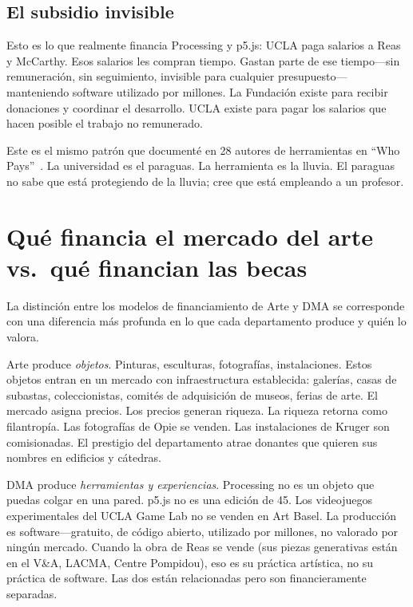 \documentclass[10pt,letterpaper,twocolumn]{article}
\newcommand{\dma}{\textsc{DMA}}
\begin{document}
\subsection{El subsidio invisible}

Esto es lo que realmente financia Processing y p5.js: UCLA paga salarios a Reas y McCarthy. Esos salarios les compran tiempo. Gastan parte de ese tiempo---sin remuneración, sin seguimiento, invisible para cualquier presupuesto---manteniendo software utilizado por millones. La Fundación existe para recibir donaciones y coordinar el desarrollo. UCLA existe para pagar los salarios que hacen posible el trabajo no remunerado.

Este es el mismo patrón que documenté en 28 autores de herramientas en ``Who Pays''~\citep{scudder2026sustainability}. La universidad es el paraguas. La herramienta es la lluvia. El paraguas no sabe que está protegiendo de la lluvia; cree que está empleando a un profesor.

\section{Qué financia el mercado del arte vs.\ qué financian las becas}

La distinción entre los modelos de financiamiento de Arte y \dma{} se corresponde con una diferencia más profunda en lo que cada departamento produce y quién lo valora.

Arte produce \emph{objetos}. Pinturas, esculturas, fotografías, instalaciones. Estos objetos entran en un mercado con infraestructura establecida: galerías, casas de subastas, coleccionistas, comités de adquisición de museos, ferias de arte. El mercado asigna precios. Los precios generan riqueza. La riqueza retorna como filantropía. Las fotografías de Opie se venden. Las instalaciones de Kruger son comisionadas. El prestigio del departamento atrae donantes que quieren sus nombres en edificios y cátedras.

\dma{} produce \emph{herramientas y experiencias}. Processing no es un objeto que puedas colgar en una pared. p5.js no es una edición de 45. Los videojuegos experimentales del UCLA Game Lab no se venden en Art Basel. La producción es software---gratuito, de código abierto, utilizado por millones, no valorado por ningún mercado. Cuando la obra de Reas se vende (sus piezas generativas están en el V\&A, LACMA, Centre Pompidou), eso es su práctica artística, no su práctica de software. Las dos están relacionadas pero son financieramente separadas.
\end{document}
